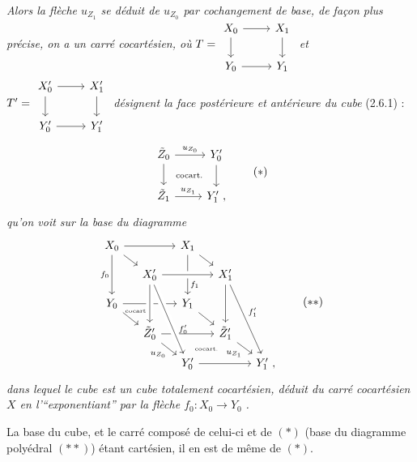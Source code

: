 \textit{Alors la flèche $u_{Z_1}$ se déduit de $u_{Z_0}$ par cochangement de base, de façon plus précise, on a un carré cocartésien, où} $T = \begin{tikzcd}[ampersand replacement=\&, baseline=(\tikzcdmatrixname.center)]
X_0 \arrow[r] \arrow[d] \& X_1 \arrow[d] \\
Y_0 \arrow[r] \& Y_1
\end{tikzcd}$ \textit{et} $T' = \begin{tikzcd}[ampersand replacement=\&, baseline=(\tikzcdmatrixname.center)]
X'_0 \arrow[r] \arrow[d] \& X'_1 \arrow[d] \\
Y'_0 \arrow[r] \& Y'_1
\end{tikzcd}$ \textit{désignent la face postérieure et antérieure du cube} \textup{(2.6.1) :}
\[
\begin{tikzcd}
\tilde{Z}_0 \arrow[r, "u_{Z_0}"] \arrow[d] \arrow[dr, phantom, "\text{\scriptsize cocart.}"] & Y'_0 \arrow[d] \\
\tilde{Z}_1 \arrow[r, "u_{Z_1}"] & Y'_1 \ ,
\end{tikzcd}
\tag*{$(*)$}
\]
\textit{qu'on voit sur la base du diagramme}
\[
\begin{tikzcd}[row sep=small, column sep=small]
X_0 \arrow[rr] \arrow[dr] \arrow[dd, "f_0"'] & & X_1 \arrow[dr] \arrow[dd, "f_1" near end] & & \\
 & X'_0 \arrow[rr, crossing over] & & X'_1 \arrow[dd] \arrow[dddr, "f'_1"] & \\
Y_0 \arrow[rr] \arrow[dr] \arrow[dr, phantom, shift left=2ex, "\text{\tiny cocart.}"] & & Y_1 \arrow[dr] & & \\
 & \tilde{Z}'_0 \arrow[rr] \arrow[dr, "u_{Z_0}"'] \arrow[from=uu, crossing over] & & \tilde{Z}'_1 \arrow[dr, "u_{Z_1}"'] & \\
 & & Y'_0 \arrow[rr] \arrow[from=uuul, crossing over, "f'_0" near end] \arrow[ur, phantom, "\text{\tiny cocart.}"] & & Y'_1 \ ,
\end{tikzcd} %
\tag*{$(**)$}
\]
\textit{dans lequel le cube est un cube totalement cocartésien, déduit du carré cocartésien $X$ en l'“exponentiant” par la flèche $f_0 : X_0 \longrightarrow Y_0$} \textit{.}

La base du cube, et le carré
composé de celui-ci et de $(*)$ (base du diagramme polyédral $(**)$) étant cartésien, il en est de même de $(*)$.

